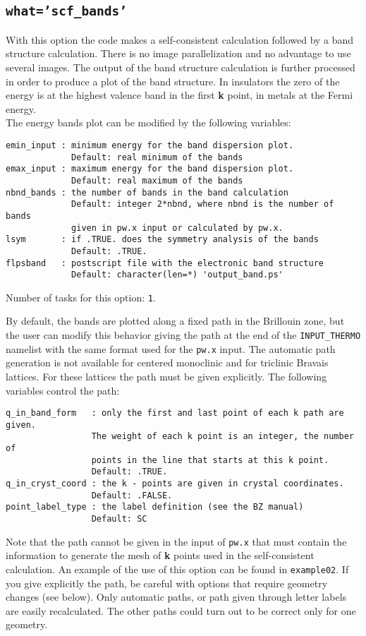 \documentclass[12pt,a4paper]{article}
\begin{document}
\subsection{\texttt{what='scf\_bands'}}
With this option the code makes a self-consistent calculation followed 
by a band structure calculation. There is no image parallelization and no
advantage to use several images. The output of the band structure 
calculation is further processed in order to produce a plot of the band 
structure.
In insulators the zero of the energy is at the highest valence band 
in the first {\bf k} point, in metals at the Fermi energy. \\
The energy bands plot can be modified by the following variables:

\begin{verbatim}
emin_input : minimum energy for the band dispersion plot.
             Default: real minimum of the bands
emax_input : maximum energy for the band dispersion plot.
             Default: real maximum of the bands
nbnd_bands : the number of bands in the band calculation
             Default: integer 2*nbnd, where nbnd is the number of bands 
             given in pw.x input or calculated by pw.x.
lsym       : if .TRUE. does the symmetry analysis of the bands
             Default: .TRUE.
flpsband   : postscript file with the electronic band structure
             Default: character(len=*) 'output_band.ps'
\end{verbatim}
Number of tasks for this option: \texttt{1}.

By default, the bands are plotted along a fixed path in the Brillouin
zone, but the user can modify this behavior giving the path at the end of 
the \texttt{INPUT\_THERMO} namelist with the same format used for 
the \texttt{pw.x} input. The automatic path generation is not available 
for centered monoclinic and for triclinic Bravais lattices. For these
lattices the path must be given explicitly.
The following variables control the path:

\begin{verbatim}
q_in_band_form   : only the first and last point of each k path are given.
                 The weight of each k point is an integer, the number of 
                 points in the line that starts at this k point.
                 Default: .TRUE.
q_in_cryst_coord : the k - points are given in crystal coordinates.
                 Default: .FALSE.
point_label_type : the label definition (see the BZ manual)
                 Default: SC
\end{verbatim}
Note that the path cannot be given in the input of \texttt{pw.x} that
must contain the information to generate the mesh of {\bf k} points 
used in the self-consistent calculation. 
An example of the use of this option can be found in \texttt{example02}.
If you give explicitly the path, be careful with options that require
geometry changes (see below). Only automatic paths, or path given through 
letter labels are easily recalculated. The other paths could turn out 
to be correct only for one geometry.
\end{document}

